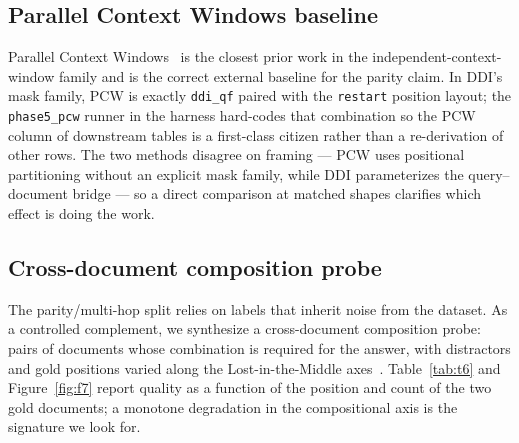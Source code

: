 \begin{table}[t]
\centering
\caption{T5 --- quality on the single-hop versus multi-hop split of every
    parity dataset, per mask variant. The gap between the columns is the
    failure-envelope signal.}
\label{tab:t5}
\end{table}


\subsection{Parallel Context Windows baseline}
\label{sec:failure-envelope-pcw}

Parallel Context Windows~\citep{ratner2023pcw} is the closest prior work
in the independent-context-window family and is the correct external
baseline for the parity claim. In DDI's mask family, PCW is exactly
\texttt{ddi\_qf} paired with the \texttt{restart} position layout; the
\texttt{phase5\_pcw} runner in the harness hard-codes that combination
so the PCW column of downstream tables is a first-class citizen rather
than a re-derivation of other rows. The two methods disagree on framing
--- PCW uses positional partitioning without an explicit mask family,
while DDI parameterizes the query--document bridge --- so a direct
comparison at matched shapes clarifies which effect is doing the work.

\subsection{Cross-document composition probe}
\label{sec:failure-envelope-composition}

The parity/multi-hop split relies on labels that inherit noise from the
dataset. As a controlled complement, we synthesize a cross-document
composition probe: pairs of documents whose combination is required for
the answer, with distractors and gold positions varied along the
Lost-in-the-Middle axes~\citep{liu2023lostmiddle}. Table~\ref{tab:t6} and
Figure~\ref{fig:f7} report quality as a function of the position and
count of the two gold documents; a monotone degradation in the
compositional axis is the signature we look for.

